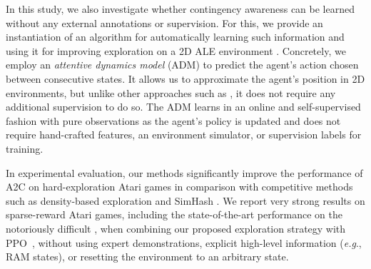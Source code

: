 \documentclass{article} \usepackage{iclr,times}
\makeatletter
\DeclareRobustCommand\onedot{\futurelet\@let@token\@onedot}
\def\onedot{.}
\def\eg{\emph{e.g}\onedot} \def\Eg{\emph{E.g}\onedot}
\makeatother
\begin{document}
In this study, we also investigate whether contingency awareness can be learned without any external annotations or supervision. 
For this, we provide an instantiation of an algorithm for automatically learning such information and using it for improving exploration on a 2D ALE environment \citep{Bellemare:JAIR2013:ALE}.
Concretely, we employ an \emph{attentive dynamics model} (ADM) to predict the agent's action chosen between consecutive states. 
It allows us to approximate the agent's position in 2D environments, but unlike other approaches such as \citep{Bellemare:AAAI2012:Contingency}, it does not require any additional supervision to do so.
The ADM learns in an online and self-supervised fashion with pure observations as the agent's policy is updated
and does not require hand-crafted features, an environment simulator, or supervision labels for training.
















































In experimental evaluation, our methods significantly improve the performance of A2C on hard-exploration Atari games
in comparison with competitive methods such as density-based exploration
\citep{Bellemare:NIPS2016:UnifyingCount,Ostrovski:ICML2017:ExplorationDensity}
and SimHash \citep{Tang:NIPS2017:SimHash}.
We report very strong results on sparse-reward Atari games, including the state-of-the-art performance on the notoriously difficult  \MontezumaRevenge,
when combining our proposed exploration strategy with PPO~\citep{schulman2017:proximal},
without using expert demonstrations, explicit high-level information (\eg, RAM states),
or resetting the environment to an arbitrary state.
\end{document}
